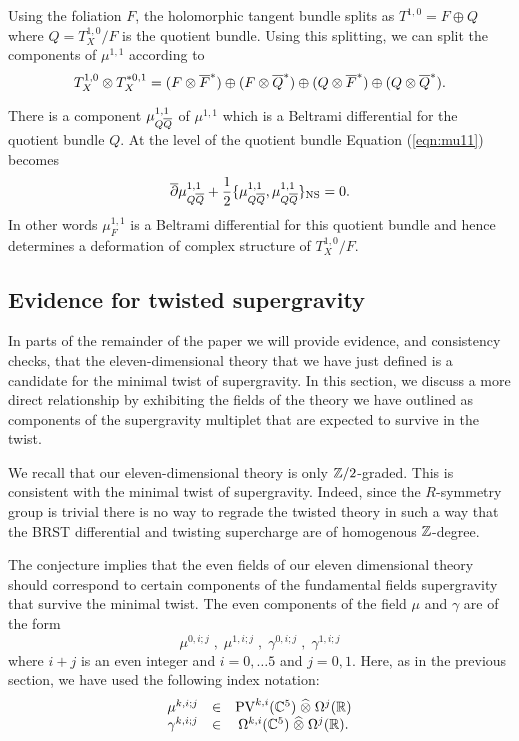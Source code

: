 \documentclass[11pt]{amsart}
\def\pv{{\rm PV}}
\begin{document}
Using the foliation $F$, the holomorphic tangent bundle splits as $T^{1,0} = F \oplus Q$ where $Q = T^{1,0}_X / F$ is the quotient bundle.
Using this splitting, we can split the components of $\mu^{1,1}$ according to
\[
  T^{1,0}_X \otimes T^{*0,1}_X = (F \otimes\Bar{F}^*) \oplus (F \otimes \Bar{Q}^*) \oplus (Q \otimes \Bar{F}^*) \oplus (Q \otimes \Bar{Q}^*) .
\]


There is a component $\mu_{Q\Bar{Q}}^{1,1}$ of $\mu^{1,1}$ which is a Beltrami differential for the quotient bundle $Q$.
At the level of the quotient bundle Equation (\ref{eqn:mu11}) becomes
\[
  \dbar \mu^{1,1}_{Q \Bar{Q}} + \frac12 \{\mu^{1,1}_{Q \Bar{Q}} , \mu^{1,1}_{Q \Bar{Q}}\}_{\rm NS} = 0 .
\]
In other words $\mu^{1,1}_F$ is a Beltrami differential for this quotient bundle and hence determines a deformation of complex structure of $T^{1,0}_X / F$.





\subsection{Evidence for twisted supergravity}


In parts of the remainder of the paper we will provide evidence, and consistency checks, that the eleven-dimensional theory that we have just defined is a candidate for the minimal twist of supergravity.
In this section, we discuss a more direct relationship by exhibiting the fields of the theory we have outlined as components of the supergravity multiplet that are expected to survive in the twist.

We recall that our eleven-dimensional theory is only $\ZZ/2$-graded.
This is consistent with the minimal twist of supergravity.
Indeed, since the $R$-symmetry group is trivial there is no way to regrade the twisted theory in such a way that the BRST differential and twisting supercharge are of homogenous $\ZZ$-degree.

The conjecture implies that the even fields of our eleven dimensional theory should correspond to certain components of the fundamental fields supergravity that survive the minimal twist.
The even components of the field $\mu$ and $\gamma$ are of the form
\[
  \mu^{0, i ; j} \; , \; \mu^{1, i ; j} \; , \; \gamma^{0, i ; j} \; , \; \gamma^{1, i ; j}
\]
where $i+j$ is an even integer and $i = 0,\ldots 5$ and $j=0,1$.
Here, as in the previous section, we have used the following index notation:
\[
  \begin{array}{ccccc}
    \mu^{k, i ; j} & \in & \pv^{k,i} (\CC^5) \; \Hat{\otimes} \; \Omega^j(\RR) \\
    \gamma^{k, i ; j} & \in & \Omega^{k,i}(\CC^5) \; \Hat{\otimes} \; \Omega^j(\RR).
  \end{array}
\]
\end{document}
